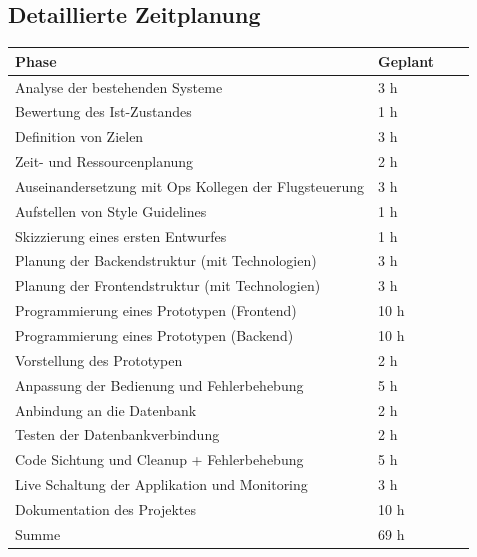 \appendix
\renewcommand{\thesection}{\Alph{section}.\arabic{section}}
\setcounter{section}{0}

\begin{appendices}

	
\section{Detaillierte Zeitplanung}
\label{appendix:zeit_detail}

\begin{table}[htp]

	\begin{center}
		\begin{tabular}{llll} \toprule
			Phase & Geplant \\ \bottomrule
			Analyse der bestehenden Systeme & 3 h \\
			Bewertung des Ist-Zustandes & 1 h \\
			Definition von Zielen & 3 h \\
			Zeit- und Ressourcenplanung & 2 h \\
			Auseinandersetzung mit Ops Kollegen der Flugsteuerung & 3 h \\
			Aufstellen von Style Guidelines & 1 h \\
			Skizzierung eines ersten Entwurfes & 1 h \\
			Planung der Backendstruktur (mit Technologien) & 3 h \\
			Planung der Frontendstruktur (mit Technologien) & 3 h \\
			Programmierung eines Prototypen (Frontend) & 10 h \\
			Programmierung eines Prototypen (Backend) & 10 h \\
			Vorstellung des Prototypen & 2 h \\
			Anpassung der Bedienung und Fehlerbehebung & 5 h \\
			Anbindung an die Datenbank & 2 h \\
			Testen der Datenbankverbindung & 2 h \\
			Code Sichtung und Cleanup + Fehlerbehebung & 5 h \\
			Live Schaltung der Applikation und Monitoring & 3 h \\
			Dokumentation des Projektes & 10 h \\ \bottomrule
		
			Summe & 69 h \\
		\end{tabular}
	\end{center}
\end{table}
\newpage





\end{appendices}
